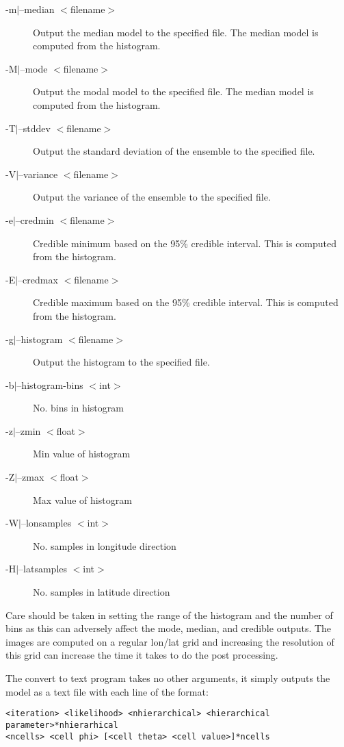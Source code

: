 \documentclass[a4paper,12pt]{article}
\begin{document}
\begin{description}
\item [-m$|$--median $<$filename$>$] Output the median model to the specified file. The median model is computed from the histogram.
\item [-M$|$--mode $<$filename$>$] Output the modal model to the specified file. The median model is computed from the histogram.
\item [-T$|$--stddev $<$filename$>$] Output the standard deviation of the ensemble to the specified file.
\item [-V$|$--variance $<$filename$>$] Output the variance of the ensemble to the specified file.
\item [-e$|$--credmin $<$filename$>$] Credible minimum based on the 95\% credible interval. This is computed from the histogram.
\item [-E$|$--credmax $<$filename$>$] Credible maximum based on the 95\% credible interval. This is computed from the histogram.
\item [-g$|$--histogram $<$filename$>$] Output the histogram to the specified file.

\item [-b$|$--histogram-bins $<$int$>$] No. bins in histogram
\item [-z$|$--zmin $<$float$>$] Min value of histogram
\item [-Z$|$--zmax $<$float$>$] Max value of histogram

\item [-W$|$--lonsamples $<$int$>$]       No. samples in longitude direction
\item [-H$|$--latsamples $<$int$>$]       No. samples in latitude direction
\end{description}

Care should be taken in setting the range of the histogram and the
number of bins as this can adversely affect the mode, median, and
credible outputs. The images are computed on a regular lon/lat grid
and increasing the resolution of this grid can increase the time it
takes to do the post processing.

The convert to text program takes no other arguments, it simply
outputs the model as a text file with each line of the format:

\begin{verbatim}
<iteration> <likelihood> <nhierarchical> <hierarchical parameter>*nhierarhical
<ncells> <cell phi> [<cell theta> <cell value>]*ncells
\end{verbatim}
\end{document}
